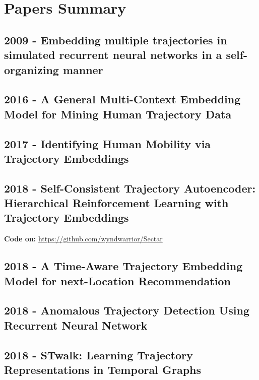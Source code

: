 \section{Papers Summary}\label{sec: papers summary}

\subsection*{2009 - Embedding multiple trajectories in simulated recurrent neural networks in a self-organizing manner}
\cite{liu2009embedding}

\subsection*{2016 - A General Multi-Context Embedding Model for Mining Human Trajectory Data}
\cite{zhou2016general}

\subsection*{2017 - Identifying Human Mobility via Trajectory Embeddings}
\cite{gao2017identifying}

\subsection*{2018 - Self-Consistent Trajectory Autoencoder: Hierarchical Reinforcement Learning with Trajectory Embeddings}

\textbf{Code on:} \url{https://github.com/wyndwarrior/Sectar}

\cite{co2018self}

\subsection*{2018 - A Time-Aware Trajectory Embedding Model for next-Location Recommendation}
\cite{zhao2018time}

\subsection*{2018 - Anomalous Trajectory Detection Using Recurrent Neural Network}
\cite{song2018anomalous}

\subsection*{2018 - STwalk: Learning Trajectory Representations in Temporal Graphs}
\cite{pandhre2018stwalk}

